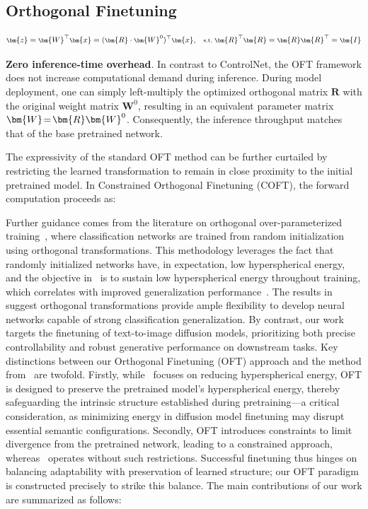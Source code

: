 \begin{itemize}[leftmargin=*,nosep]
\section{Orthogonal Finetuning}

\begin{equation}\label{eq:oft_general}
    \footnotesize
    \bm{z}=\bm{W}^\top\bm{x}=(\bm{R}\cdot\bm{W}^0)^\top\bm{x},~~~\text{s.t.}~\bm{R}^\top\bm{R}=\bm{R}\bm{R}^\top=\bm{I}
\end{equation}

\textbf{Zero inference-time overhead}. In contrast to ControlNet, the OFT framework does not increase computational demand during inference. During model deployment, one can simply left-multiply the optimized orthogonal matrix $\bm{R}$ with the original weight matrix $\bm{W}^0$, resulting in an equivalent parameter matrix $\thickmuskip=2mu \medmuskip=2mu \bm{W}=\bm{R}\bm{W}^0$. Consequently, the inference throughput matches that of the base pretrained network.

The expressivity of the standard OFT method can be further curtailed by restricting the learned transformation to remain in close proximity to the initial pretrained model. In Constrained Orthogonal Finetuning (COFT), the forward computation proceeds as:

Further guidance comes from the literature on orthogonal over-parameterized training~\cite{liu2021orthogonal}, where classification networks are trained from random initialization using orthogonal transformations. This methodology leverages the fact that randomly initialized networks have, in expectation, low hyperspherical energy, and the objective in~\cite{liu2021orthogonal} is to sustain low hyperspherical energy throughout training, which correlates with improved generalization performance~\cite{liu2018learning,lin2020regularizing}. The results in~\cite{liu2021orthogonal} suggest orthogonal transformations provide ample flexibility to develop neural networks capable of strong classification generalization. By contrast, our work targets the finetuning of text-to-image diffusion models, prioritizing both precise controllability and robust generative performance on downstream tasks. Key distinctions between our Orthogonal Finetuning (OFT) approach and the method from~\cite{liu2021orthogonal} are twofold. Firstly, while~\cite{liu2021orthogonal} focuses on reducing hyperspherical energy, OFT is designed to preserve the pretrained model’s hyperspherical energy, thereby safeguarding the intrinsic structure established during pretraining—a critical consideration, as minimizing energy in diffusion model finetuning may disrupt essential semantic configurations. Secondly, OFT introduces constraints to limit divergence from the pretrained network, leading to a constrained approach, whereas~\cite{liu2021orthogonal} operates without such restrictions. Successful finetuning thus hinges on balancing adaptability with preservation of learned structure; our OFT paradigm is constructed precisely to strike this balance. The main contributions of our work are summarized as follows:


\end{itemize}
